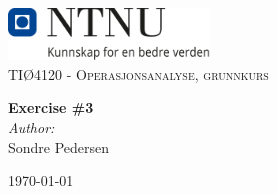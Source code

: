 

\begin{titlepage}
    \vbox{ }
    \vbox{ }
    \begin{center}
        \includegraphics[width=0.40\textwidth]{NTNU_logo.png}\\[1cm]
    \textsc{\Large TIØ4120 - Operasjonsanalyse, grunnkurs}\\[0.5cm]
    \vbox{ }
    
    { \huge \bfseries Exercise \#3}\\[0.4cm]
    
    \large
    \emph{Author:}\\
    Sondre Pedersen
    \vfill
    
    {\large\today}
\end{center}
\end{titlepage}